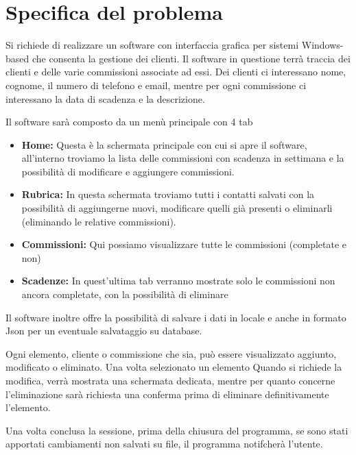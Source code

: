 \section{Specifica del problema}
Si richiede di realizzare un software con interfaccia grafica per sistemi Windows-based che consenta la gestione dei clienti. Il software in questione terrà traccia dei clienti e delle varie commissioni
associate ad essi. Dei clienti ci interessano nome, cognome, il numero di telefono e email, mentre per ogni commissione ci interessano
la data di scadenza e la descrizione.

Il software sarà composto da un menù principale con 4 tab 
\begin{itemize}
        \item \textbf{Home:} Questa è la schermata principale con cui si apre il software, all'interno
        troviamo la lista delle commissioni con scadenza in settimana e la possibilità di modificare
        e aggiungere commissioni.
        \item \textbf{Rubrica:} In questa schermata troviamo tutti i contatti %
        salvati con la possibilità di aggiungerne nuovi, modificare quelli già presenti o eliminarli (eliminando le relative commissioni).
        \item \textbf{Commissioni:} Qui possiamo visualizzare tutte le commissioni (completate e non)
        \item \textbf{Scadenze:} In quest'ultima tab verranno mostrate solo le commissioni non ancora completate, con la possibilità di eliminare

\end{itemize}


\medskip
Il software inoltre offre la possibilità di salvare i dati in locale e anche in formato Json per un eventuale
salvataggio su database.




\medskip
Ogni elemento, cliente o commissione che sia, può essere visualizzato aggiunto, modificato o eliminato.
Una volta selezionato un elemento 
Quando si richiede la modifica, verrà mostrata una schermata dedicata, mentre per quanto concerne l'eliminazione  
sarà richiesta una conferma prima di eliminare definitivamente l'elemento.

\medskip
Una volta conclusa la sessione, prima della chiusura del programma, se sono stati apportati cambiamenti non salvati su file,
il programma notifcherà l'utente. 

